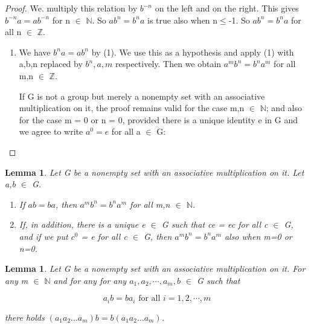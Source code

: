 \documentclass[11pt]{amsbook}
\newtheorem{lemma}[theorem]{Lemma}
\begin{document}

\begin{proof}We. multiply this relation by $b^{-n}$  on the left and on the right. This gives
$b^{-n}a=ab^{-n}$ for n $\in$ $\mathbb{N}$. So $ab^{n}=b^{n}a$ is true also when n$\leq$-1. So $ab^{n}=b^{n}a$ for all  n $\in$ $\mathbb{Z}$.


\begin{enumerate}

	\item We have $b^{n}a=ab^{n}$ by (1). We use this as a hypothesis and apply (1)
with a,b,n replaced by $b^{n}, a, m$ respectively. Then we obtain $a^{m}b^{n}=b^{n}a^{m}$
for all m,n $\in$ $\mathbb{Z}$.


If G is not a group but merely a nonempty set with an associative
multiplication on it, the proof remains valid for the case m,n $\in$ $\mathbb{N}$; and
also for the case m = 0 or n = 0, provided there is a unique identity e in
G and we agree to write $a^{0} = e $ for all a $\in$ G:

\end{enumerate}

\end{proof}

\begin{lemma}
Let G be a nonempty set with an associative multiplication
on it. Let a,b $\in$ G.

\begin{enumerate}

	\item 
	If $ab = ba$, then $a^{m}b^{n}=b^{n}a^{m}$ for all m,n $\in$ $\mathbb{N}$. 

	\item 
	If, in addition, there is a unique e $\in$ G such that ce = ec for all c $\in$ G,
and if we put $c^{0}$ = e for all c $\in$ G, then $a^{m}b^{n}=b^{n}a^{m}$ also when m=0 or
n=0.
\end{enumerate}

\end{lemma}

\begin{lemma}
Let G be a nonempty set with an associative multiplication
on it. For any m $\in$ $\mathbb{N}$ and for any  for any $a_{1}, a_{2},\dotsb,a_{m}, b$ $\in$ G such that

\[
	a_{i}b=ba_{i}
	\text{ for all }
	i = 1,2, \dotsb ,m
\]

there holds $(a_{1}a_{2}\dots a_{m})b = b(a_{1}a_{2}\dots a_{m})$.
\end{lemma}
\end{document}
